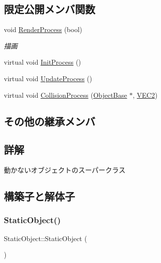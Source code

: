 \subsection*{限定公開メンバ関数}
\begin{DoxyCompactItemize}
\item 
void \mbox{\hyperlink{class_static_object_afec57009537695c4715386120a619942}{Render\+Process}} (bool)
\begin{DoxyCompactList}\small\item\em 描画 \end{DoxyCompactList}\item 
virtual void \mbox{\hyperlink{class_static_object_afa0709f50495338a23c1140062a567af}{Init\+Process}} ()
\item 
virtual void \mbox{\hyperlink{class_static_object_a7fa678c3c4032bb6e9417f93a8bb895c}{Update\+Process}} ()
\item 
virtual void \mbox{\hyperlink{class_static_object_ab17d0cb5b2544054022356a7ee4000db}{Collision\+Process}} (\mbox{\hyperlink{class_object_base}{Object\+Base}} $\ast$, \mbox{\hyperlink{common_8h_afb0c5e21d4133ff4f200992c0b534e1b}{V\+E\+C2}})
\end{DoxyCompactItemize}
\subsection*{その他の継承メンバ}


\subsection{詳解}
動かないオブジェクトのスーパークラス 

\subsection{構築子と解体子}
\mbox{\label{class_static_object_a2a8e918ddfe5c6723b88b9f5c4156472}} 
\subsubsection{\texorpdfstring{Static\+Object()}{StaticObject()}}
{\footnotesize\ttfamily Static\+Object\+::\+Static\+Object (\begin{DoxyParamCaption}{ }\end{DoxyParamCaption})\hspace{0.3cm}{\ttfamily [inline]}}




